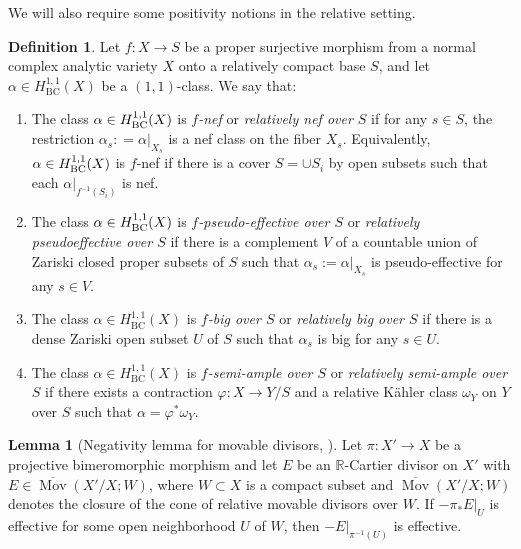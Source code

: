 \documentclass[11pt]{amsart}
\numberwithin{equation}{section}
\theoremstyle{definition}
\theoremstyle{definition}
\newtheorem{lemma}[theorem]{Lemma}
\theoremstyle{definition}
\newtheorem{definition}[theorem]{Definition}
\begin{document}
We will also require some positivity notions in the relative setting. 

\begin{definition}
Let $f: X \rightarrow S$ be a proper surjective morphism from a normal complex analytic variety $X$ onto a relatively compact base $S$, and let $\alpha \in H_{\mathrm{BC}}^{1,1}(X)$ be a $(1,1)$-class. We say that:
\begin{enumerate}
\item The class $\alpha \in H^{1,1}_{\rm{BC}}(X)$ is \textit{$f$-nef} or \textit{relatively nef over $S$} if for any $s\in S$, the restriction $\alpha_s : = \alpha|_{X_s}$ is a nef class on the fiber $X_s$. Equivalently, $\alpha \in H^{1,1}_{\rm{BC}}(X)$ is {$f$-nef} if there is a cover $S=\cup S_i$ by open subsets such that each $\alpha |_{f^{-1}(S_i)}$ is nef.
\item The class $\alpha \in H^{1,1}_{\rm{BC}}(X)$ is \textit{$f$-pseudo-effective over $S$} or \textit{relatively pseudoeffective over $S$} if there is a complement $V$ of a countable union of Zariski closed proper subsets of $S$ such that $\alpha_s:=\left.\alpha\right|_{X_s}$ is pseudo-effective for any $s \in V$.
\item The class $\alpha \in H_{\mathrm{BC}}^{1,1}(X)$ is \textit{$f$-big over $S$} or \textit{relatively big over $S$} if there is a dense Zariski open subset $U$ of $S$ such that $\alpha_s$ is big for any $s \in U$.

\item The class $\alpha \in H_{\mathrm{BC}}^{1,1}(X)$ is \textit{$f$-semi-ample over $S$} or \textit{relatively semi-ample over $S$} if there exists a contraction $\varphi: X\to Y/S$ and a relative K\"ahler class $\omega_Y$ on $Y$ over $S$ such that $\alpha = \varphi^* \omega_Y$. 
\end{enumerate}
\end{definition}


\begin{lemma}[{Negativity lemma for movable divisors, \cite{Fuj22}}]\label{l-negativity}
Let $\pi:X'\to X$ be a projective bimeromorphic morphism and let $E$ be an $\mathbb{R}$-Cartier divisor on $X'$ with $E\in\overline{\operatorname{Mov}}(X'/X;W)$, where $W\subset X$ is a compact subset and $\overline{\operatorname{Mov}}(X'/X;W)$ denotes the closure of the cone of relative movable divisors over $W$. If $-\pi_*E|_U$ is effective for some open neighborhood $U$ of $W$, then $-E|_{\pi^{-1}(U)}$ is effective.
\end{lemma}
\end{document}
